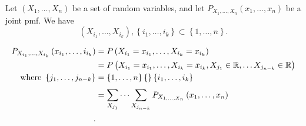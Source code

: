 

Let $\left( X_{1}, \ldots, X_{n} \right) $ be a set of random variables, and let $P_{X_{1}, \ldots, X_{n}} \left( x_1, \ldots, x_{n} \right) $ be a joint pmf. We have 
\[
	\left( X_{i_{1}}, \ldots, X_{i_{k}} \right) , \left\{ i_{1}, \ldots, i_{k} \right\} \subset \left\{ 1, \ldots, n \right\} 
.\] 

\begin{align*}
	P_{X_{i_{1}}, \ldots , X _{i_{k}}} \left( x_{i_{1}}, \ldots , i _{i_{k}} \right) &= P\left( X_{i_{1}} = x_{i_{1}}, \ldots , X _{i_{k}} = x_{i_{k}}\right)  \\
											 &= P\left( X_{i_{1}} = x_{i_{1}}, \ldots, X _{i_{k}} = x _{i_{k}}, X _{j_{1}} \in \mathbb{R}, \ldots X _{j_{n-k}} \in \mathbb{R} \right)  \\
	\text{where  } \left\{ j _{1} , \ldots, j _{n-k}	\right\} &= \left\{ 1 , \ldots, n \right\} \{\}  \left\{ i_{1}, \ldots, i_{k} \right\} \\
									 &= \sum_{X_{j_{1}}}^{} \cdots \sum_{X_{j_{n-k}}}^{} P_{X_{1, \ldots, X_{n}}} \left( x_{1}, \ldots, x_{n} \right)  \\
.\end{align*}

